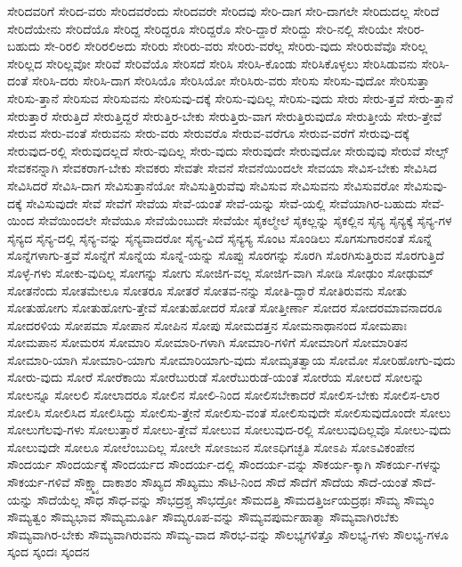{ಸೇರಿದವರಿಗೆ
ಸೇರಿದ-ವರು
ಸೇರಿದವರೆಂದು
ಸೇರಿದವರೇ
ಸೇರಿದವು
ಸೇರಿ-ದಾಗ
ಸೇರಿ-ದಾಗಲೇ
ಸೇರಿದುದಲ್ಲ
ಸೇರಿದೆ
ಸೇರಿದೆಯೇನು
ಸೇರಿದೆಯೊ
ಸೇರಿದ್ದ
ಸೇರಿದ್ದರೂ
ಸೇರಿದ್ದರೊ
ಸೇರಿ-ದ್ದಾರೆ
ಸೇರಿದ್ದು
ಸೇರಿ-ನಲ್ಲಿ
ಸೇರಿಯೇ
ಸೇರಿರ-ಬಹುದು
ಸೇ-ರಿರಲಿ
ಸೇರಿರಲಿಅದು
ಸೇರಿರು
ಸೇರಿರು-ವರು
ಸೇರಿರು-ವರೆಲ್ಲ
ಸೇರಿರು-ವುದು
ಸೇರಿರುವೆವೊ
ಸೇರಿಲ್ಲ
ಸೇರಿಲ್ಲದ
ಸೇರಿಲ್ಲವೋ
ಸೇರಿವೆ
ಸೇರಿವೆಯೊ
ಸೇರಿಸದೆ
ಸೇರಿಸಿ
ಸೇರಿಸಿ-ಕೊಂಡು
ಸೇರಿಸಿಕೊಳ್ಳಲು
ಸೇರಿಸಿಡುವನು
ಸೇರಿಸಿ-ದಂತೆ
ಸೇರಿಸಿ-ದರು
ಸೇರಿಸಿ-ದಾಗ
ಸೇರಿಸಿಯೊ
ಸೇರಿಸಿಯೋ
ಸೇರಿಸಿರು-ವರು
ಸೇರಿಸು
ಸೇರಿಸು-ವುದೋ
ಸೇರಿಸುತ್ತಾ
ಸೇರಿಸು-ತ್ತಾನೆ
ಸೇರಿಸುವ
ಸೇರಿಸುವನು
ಸೇರಿಸುವು-ದಕ್ಕೆ
ಸೇರಿಸು-ವುದಿಲ್ಲ
ಸೇರಿಸು-ವುದು
ಸೇರು
ಸೇರು-ತ್ತವೆ
ಸೇರು-ತ್ತಾನೆ
ಸೇರುತ್ತಾರೆ
ಸೇರುತ್ತಿದೆ
ಸೇರುತ್ತಿದ್ದರೆ
ಸೇರುತ್ತಿರ-ಬೇಕು
ಸೇರುತ್ತಿರು-ವಾಗ
ಸೇರುತ್ತಿರುವುದೊ
ಸೇರುತ್ತೀಯೆ
ಸೇರು-ತ್ತೇವೆ
ಸೇರುವ
ಸೇರು-ವಂತೆ
ಸೇರುವನು
ಸೇರು-ವರು
ಸೇರುವರೊ
ಸೇರುವ-ವರೆಗೂ
ಸೇರುವ-ವರೆಗೆ
ಸೇರುವು-ದಕ್ಕೆ
ಸೇರುವುದ-ರಲ್ಲಿ
ಸೇರುವುದಲ್ಲದೆ
ಸೇರು-ವುದಿಲ್ಲ
ಸೇರು-ವುದು
ಸೇರುವುದೇ
ಸೇರುವುದೋ
ಸೇರುವುವು
ಸೇರುವೆ
ಸೇಲ್ಸ್
ಸೇವಕನನ್ನಾಗಿ
ಸೇವಕರಾಗ-ಬೇಕು
ಸೇವಕರು
ಸೇವತೇ
ಸೇವನೆ
ಸೇವನೆಯಿಂದಲೇ
ಸೇವಯಾ
ಸೇವಿಸ-ಬೇಕು
ಸೇವಿಸಿದ
ಸೇವಿಸಿದರೆ
ಸೇವಿಸಿ-ದಾಗ
ಸೇವಿಸುತ್ತಾನೆಯೋ
ಸೇವಿಸುತ್ತಿರುವೆವು
ಸೇವಿಸುವ
ಸೇವಿಸುವನು
ಸೇವಿಸುವರೋ
ಸೇವಿಸುವು-ದಕ್ಕೆ
ಸೇವಿಸುವುದೇ
ಸೇವೆ
ಸೇವೆಗೆ
ಸೇವೆಯ
ಸೇವೆ-ಯಂತೆ
ಸೇವೆ-ಯನ್ನು
ಸೇವೆ-ಯಲ್ಲಿ
ಸೇವೆಯಾಗಿರ-ಬಹುದು
ಸೇವೆ-ಯಿಂದ
ಸೇವೆಯಿಂದಲೇ
ಸೇವೆಯೂ
ಸೇವೆಯೆಂಬುದೇ
ಸೇವೆಯೇ
ಸೈಕಲ್ಮೇಲೆ
ಸೈಕಲ್ಲನ್ನು
ಸೈಕಲ್ಲಿನ
ಸೈನ್ಯ
ಸೈನ್ಯಕ್ಕೆ
ಸೈನ್ಯ-ಗಳ
ಸೈನ್ಯದ
ಸೈನ್ಯ-ದಲ್ಲಿ
ಸೈನ್ಯ-ವನ್ನು
ಸೈನ್ಯವಾದರೋ
ಸೈನ್ಯ-ವಿದೆ
ಸೈನ್ಯಸ್ಯ
ಸೊಂಟ
ಸೊಂಡಿಲು
ಸೊಗಸುಗಾರನಂತೆ
ಸೊನ್ನೆ
ಸೊನ್ನೆಗಳಾಗು-ತ್ತವೆ
ಸೊನ್ನೆಗೆ
ಸೊನ್ನೆಯ
ಸೊನ್ನೆ-ಯನ್ನು
ಸೊಪ್ಪು
ಸೊರಗನ್ನು
ಸೊರಗಿ
ಸೊರಗಿಸುತ್ತಿರುವ
ಸೊರಗುತ್ತಿದೆ
ಸೊಳ್ಳೆ-ಗಳು
ಸೋಕು-ವುದಿಲ್ಲ
ಸೋಗನ್ನು
ಸೋಗು
ಸೋಜಿಗ-ವಲ್ಲ
ಸೋಜಿಗ-ವಾಗಿ
ಸೋಡಿ
ಸೋಢುಂ
ಸೋಢುಮ್
ಸೋತನೆಂದು
ಸೋತಮೇಲೂ
ಸೋತರೂ
ಸೋತರೆ
ಸೋತವ-ನನ್ನು
ಸೋತಿ-ದ್ದಾರೆ
ಸೋತಿರುವನು
ಸೋತು
ಸೋತುಹೋಗು
ಸೋತುಹೋಗು-ತ್ತೇವೆ
ಸೋತುಹೋದರೆ
ಸೋತೆ
ಸೋತ್ತೀರ್ಣಾ
ಸೋದರ
ಸೋದರಮಾವನಾದರೂ
ಸೋದರಳಿಯ
ಸೋಪಮಾ
ಸೋಪಾನ
ಸೋಪಿನ
ಸೋಪು
ಸೋಮದತ್ತನ
ಸೋಮನಾಥಾನಂದ
ಸೋಮಪಾಃ
ಸೋಮಪಾನ
ಸೋಮರಸ
ಸೋಮಾರಿ
ಸೋಮಾರಿ-ಗಳಾಗಿ
ಸೋಮಾರಿ-ಗಳಿಗೆ
ಸೋಮಾರಿಗೆ
ಸೋಮಾರಿತನ
ಸೋಮಾರಿ-ಯಾಗಿ
ಸೋಮಾರಿ-ಯಾಗು
ಸೋಮಾರಿಯಾಗು-ವುದು
ಸೋಮೃತತ್ವಾಯ
ಸೋಮೋ
ಸೋರಿಹೋಗು-ವುದು
ಸೋರು-ವುದು
ಸೋರೆ
ಸೋರೆಕಾಯಿ
ಸೋರೆಬುರುಡೆ
ಸೋರೆಬುರುಡೆ-ಯಂತೆ
ಸೋರೆಯ
ಸೋಲದೆ
ಸೋಲನ್ನು
ಸೋಲನ್ನೂ
ಸೋಲಲಿ
ಸೋಲಾದರೂ
ಸೋಲಿನ
ಸೋಲಿ-ನಿಂದ
ಸೋಲಿಸಬೇಕಾದರೆ
ಸೋಲಿಸ-ಬೇಕು
ಸೋಲಿಸ-ಲಾರ
ಸೋಲಿಸಿ
ಸೋಲಿಸಿದ
ಸೋಲಿಸಿದ್ದು
ಸೋಲಿಸು-ತ್ತೇನೆ
ಸೋಲಿಸು-ವಂತೆ
ಸೋಲಿಸುವುದೇ
ಸೋಲಿಸುವುದೊಂದೇ
ಸೋಲು
ಸೋಲುಗೆಲವು-ಗಳು
ಸೋಲುತ್ತಾರೆ
ಸೋಲು-ತ್ತೇವೆ
ಸೋಲುವ
ಸೋಲುವುದ-ರಲ್ಲಿ
ಸೋಲುವುದಿಲ್ಲವೊ
ಸೋಲು-ವುದು
ಸೋಲುವುದೇ
ಸೋಲೂ
ಸೋಲೆಂಬುದಿಲ್ಲ
ಸೋಲೇ
ಸೋಽಜುನ
ಸೋಽಧಿಗಚ್ಛತಿ
ಸೋಽಪಿ
ಸೋಽವಿಕಂಪೇನ
ಸೌಂದರ್ಯ
ಸೌಂದರ್ಯಕ್ಕೆ
ಸೌಂದರ್ಯದ
ಸೌಂದರ್ಯ-ದಲ್ಲಿ
ಸೌಂದರ್ಯ-ವನ್ನು
ಸೌಕರ್ಯ-ಕ್ಕಾಗಿ
ಸೌಕರ್ಯ-ಗಳನ್ನು
ಸೌಕರ್ಯ-ಗಳಿವೆ
ಸೌಕ್ಷ್ಮ್ಯಾದಾಕಾಶಂ
ಸೌಖ್ಯದ
ಸೌಖ್ಯಮು
ಸೌಟಿ-ನಿಂದ
ಸೌದೆ
ಸೌದೆಗೆ
ಸೌದೆಯ
ಸೌದೆ-ಯಂತೆ
ಸೌದೆ-ಯನ್ನು
ಸೌದೆಯೆಲ್ಲ
ಸೌಧ
ಸೌಧ-ವನ್ನು
ಸೌಭದ್ರಶ್ಚ
ಸೌಭದ್ರೋ
ಸೌಮದತ್ತಿ
ಸೌಮದತ್ತಿರ್ಜಯದ್ರಥಃ
ಸೌಮ್ಯ
ಸೌಮ್ಯಂ
ಸೌಮ್ಯತ್ವಂ
ಸೌಮ್ಯಭಾವ
ಸೌಮ್ಯಮೂರ್ತಿ
ಸೌಮ್ಯರೂಪ-ವನ್ನು
ಸೌಮ್ಯವಪುರ್ಮಹಾತ್ಮಾ
ಸೌಮ್ಯವಾಗಿರಬೆಕು
ಸೌಮ್ಯವಾಗಿರ-ಬೇಕು
ಸೌಮ್ಯವಾಗಿರುವನು
ಸೌಮ್ಯ-ವಾದ
ಸೌರಭ-ವನ್ನು
ಸೌಲಭ್ಯಗಳಿತ್ತೊ
ಸೌಲಭ್ಯ-ಗಳು
ಸೌಲಭ್ಯ-ಗಳೂ
ಸ್ಕಂದ
ಸ್ಕಂದಃ
ಸ್ಕಂದನ
}
